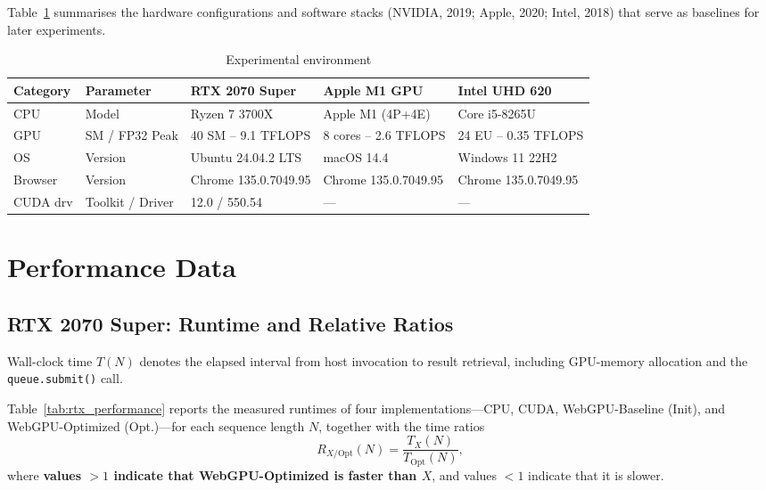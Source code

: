 \documentclass[PhD]{PHlab-thesis}
\begin{document}
Table~\ref{tab:exp_env} summarises the hardware configurations and software stacks (NVIDIA, 2019; Apple, 2020; Intel, 2018) that serve as baselines for later experiments.

\begin{table}[htbp]
  \centering
  \caption{Experimental environment}
  \label{tab:exp_env}
  \setlength{\tabcolsep}{8pt}
  \renewcommand{\arraystretch}{1.4}
  \small
  \begin{tabularx}{\textwidth}{@{}lX X X X@{}}
    \toprule
    Category & Parameter & RTX 2070 Super & Apple M1 GPU & Intel UHD 620 \\
    \midrule
    CPU      & Model                 & Ryzen 7 3700X          & Apple M1 (4P+4E) & Core i5-8265U \\
    GPU      & SM / FP32 Peak        & 40 SM – 9.1 TFLOPS     & 8 cores – 2.6 TFLOPS & 24 EU – 0.35 TFLOPS \\
    OS       & Version               & Ubuntu 24.04.2 LTS     & macOS 14.4          & Windows 11 22H2 \\
    Browser  & Version               & Chrome 135.0.7049.95  & Chrome 135.0.7049.95 & Chrome 135.0.7049.95 \\
    CUDA drv & Toolkit / Driver      & 12.0 / 550.54          & —                   & — \\
    \bottomrule
  \end{tabularx}
\end{table}


\section{Performance Data}

\subsection{RTX 2070 Super: Runtime and Relative Ratios}
Wall-clock time $T(N)$ denotes the elapsed interval from host invocation to
result retrieval, including GPU-memory allocation and the
\texttt{queue.submit()} call.

Table~\ref{tab:rtx_performance} reports the measured runtimes of four
implementations—CPU, CUDA, WebGPU-Baseline (Init), and WebGPU-Optimized
(Opt.)—for each sequence length $N$, together with the time ratios
\[
  R_{X/\mathrm{Opt}}(N)=\frac{T_{X}(N)}{T_{\mathrm{Opt}}(N)},
\]
where \textbf{values $>1$ indicate that WebGPU-Optimized is faster than
$X$}, and values $<1$ indicate that it is slower.
\end{document}

